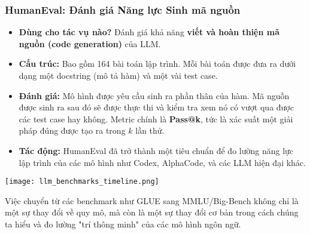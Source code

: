 \subsubsection{HumanEval: Đánh giá Năng lực Sinh mã nguồn}
\begin{itemize}
    \item \textbf{Dùng cho tác vụ nào?} Đánh giá khả năng \textbf{viết và hoàn thiện mã nguồn (code generation)} của LLM.
    \item \textbf{Cấu trúc:} Bao gồm 164 bài toán lập trình. Mỗi bài toán được đưa ra dưới dạng một docstring (mô tả hàm) và một vài test case.
    \item \textbf{Đánh giá:} Mô hình được yêu cầu sinh ra phần thân của hàm. Mã nguồn được sinh ra sau đó sẽ được thực thi và kiểm tra xem nó có vượt qua được các test case hay không. Metric chính là \textbf{Pass@k}, tức là xác suất một giải pháp đúng được tạo ra trong $k$ lần thử.
    \item \textbf{Tác động:} HumanEval đã trở thành một tiêu chuẩn để đo lường năng lực lập trình của các mô hình như Codex, AlphaCode, và các LLM hiện đại khác.
\end{itemize}

\begin{center}
    \texttt{[image: llm\_benchmarks\_timeline.png]}
    \label{fig:llm_benchmarks_timeline}
\end{center}

Việc chuyển từ các benchmark như GLUE sang MMLU/Big-Bench không chỉ là một sự thay đổi về quy mô, mà còn là một sự thay đổi cơ bản trong cách chúng ta hiểu và đo lường "trí thông minh" của các mô hình ngôn ngữ.